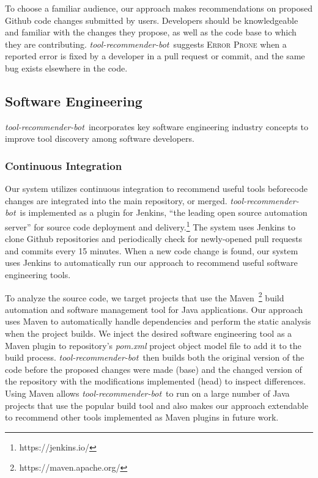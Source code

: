 \documentclass[sigconf,review,anonymous]{acmart}
\newcommand{\tool}{\textsl{tool-recommender-bot}}
\begin{document}
To choose a familiar audience, our approach makes recommendations on proposed Github code changes submitted by users. Developers should be knowledgeable and familiar with the changes they propose, as well as the code base to which they are contributing. \tool~suggests \textsc{Error Prone} when a reported error is fixed by a developer in a pull request or commit, and the same bug exists elsewhere in the code. 

\subsection{Software Engineering}

\tool~incorporates key software engineering industry concepts to improve tool discovery among software developers.

\subsubsection{Continuous Integration}

Our system utilizes continuous integration to recommend useful tools beforecode changes are integrated into the main repository, or merged. \tool~is implemented as a plugin for Jenkins, ``the leading open source automation server'' for source code deployment and delivery.\footnote{https://jenkins.io/} The system uses Jenkins to clone Github repositories and periodically check for newly-opened pull requests and commits every 15 minutes. When a new code change is found, our system uses Jenkins to automatically run our approach to recommend useful software engineering tools.

To analyze the source code, we target projects that use the Maven~\footnote{https://maven.apache.org/} build automation and software management tool for Java applications. Our approach uses Maven to automatically handle dependencies and perform the static analysis when the project builds. We inject the desired software engineering tool as a Maven plugin to repository's \textit{pom.xml} project object model file to add it to the build process. \tool~then builds both the original version of the code before the proposed changes were made (base) and the changed version of the repository with the modifications implemented (head) to inspect differences. Using Maven allows \tool~to run on a large number of Java projects that use the popular build tool and also makes our approach extendable to recommend other tools implemented as Maven plugins in future work. 
\end{document}
